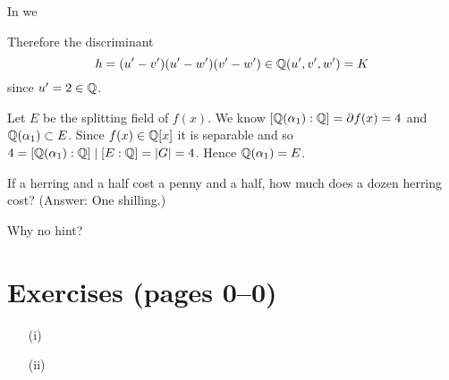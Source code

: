 \begin{myenumerate}
\begin{itemize}
\begin{itemize}
   \end{itemize}

   In \FcLab{\alpha} we


   Therefore the discriminant
   \begin{equation*}
    h = (u'-v')(u'-w')(v'-w') \in \mathbb{Q}(u',v',w') = K
   \end{equation*}
   since \(u'=2\in\mathbb{Q}\).
   
   Let $E$ be the splitting field of \(f(x)\).
   We know \([\mathbb{Q}(\alpha_1):\mathbb{Q}] = \partial f(x) = 4\)
   and \(\mathbb{Q}(\alpha_1) \subset E\).
   Since \(f(x)\in \mathbb{Q}[x]\) it is separable and so 
   \(4 = [\mathbb{Q}(\alpha_1):\mathbb{Q}] \mid [E:\mathbb{Q}] = |G| = 4\).
   Hence \(\mathbb{Q}(\alpha_1) = E\). 
 \fi
   
   
\end{itemize}


\item
\begin{excopy}
If a herring and a half cost a penny and a half,
how much does a dozen herring cost?
(Answer: One shilling.)
\end{excopy}

Why no hint?



\end{myenumerate}

\iffalse

\section{Exercises (pages 0--0)}

\begin{myenumerate}

\item
\begin{excopy}
\end{excopy}

\end{myenumerate}

\item
\begin{excopy}
\begin{itemize}
 \item[(i)]
 \item[(ii)]
\end{itemize}
\end{excopy}

